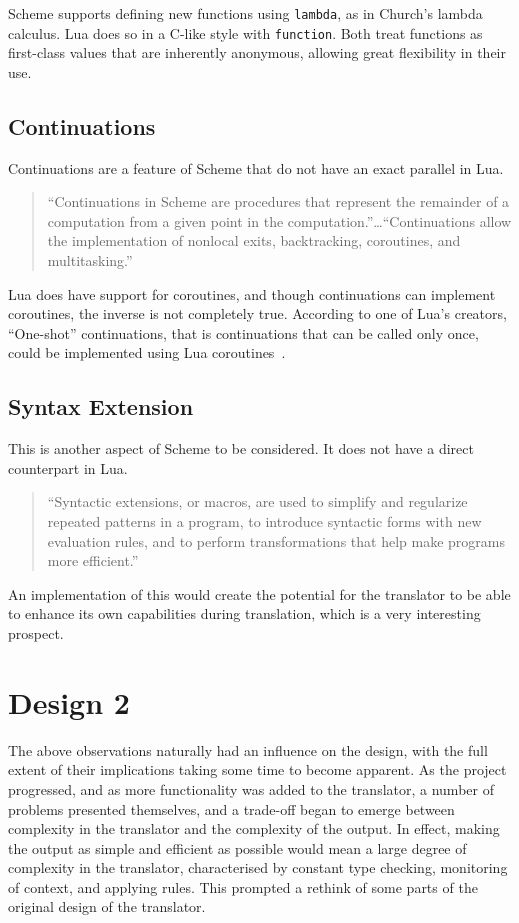Scheme supports defining new functions using \texttt{lambda}, as in Church's
lambda calculus. Lua does so in a C-like style with \texttt{function}. Both
treat functions as first-class values that are inherently anonymous, allowing
great flexibility in their use.

\subsection{Continuations}

Continuations are a feature of Scheme that do not have an exact parallel in Lua.
\begin{quotation}
``Continuations in Scheme are procedures that represent the remainder of a
computation from a given point in the computation.''\ldots``Continuations allow
the implementation of nonlocal exits, backtracking, coroutines, and
multitasking.''~\cite[Sec~5.6]{tspl}
\end{quotation}

Lua does have support for coroutines, and though continuations can implement
coroutines, the inverse is not completely true. According to one of Lua's
creators, ``One-shot'' continuations, that is continuations that can be called
only once, could be implemented using Lua coroutines~\cite[Slide~14]{luaslides}.

\subsection{Syntax Extension}

This is another aspect of Scheme to be considered. It does not have a direct
counterpart in Lua.

\begin{quotation}
``Syntactic extensions, or macros, are used to simplify and regularize repeated
patterns in a program, to introduce syntactic forms with new evaluation rules,
and to perform transformations that help make programs more
efficient.''~\cite[Ch~8]{tspl}
\end{quotation}

An implementation of this would create the potential for the translator to be
able to enhance its own capabilities during translation, which is a very
interesting prospect.


\section{Design 2}

The above observations naturally had an influence on the design, with the full
extent of their implications taking some time to become apparent. As the project
progressed, and as more functionality was added to the translator, a number of
problems presented themselves, and a trade-off began to emerge between
complexity in the translator and the complexity of the output. In effect, making
the output as simple and efficient as possible would mean a large degree of
complexity in the translator, characterised by constant type checking,
monitoring of context, and applying rules. This prompted a rethink of some parts
of the original design of the translator.

